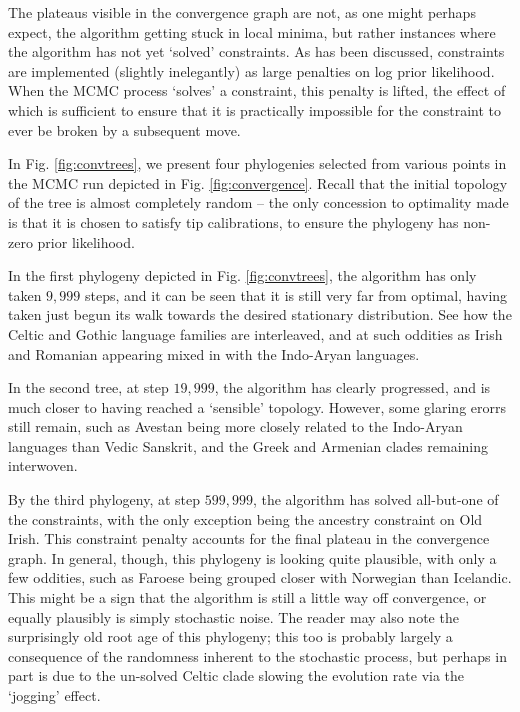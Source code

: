 \documentclass[10pt,journal,compsoc]{IEEEtran}
\begin{document}
The plateaus visible in the convergence graph are not, as one might perhaps expect, the algorithm getting stuck in local minima, but rather instances where the algorithm has not yet `solved' constraints. As has been discussed, constraints are implemented (slightly inelegantly) as large penalties on log prior likelihood. When the MCMC process `solves' a constraint, this penalty is lifted, the effect of which is sufficient to ensure that it is practically impossible for the constraint to ever be broken by a subsequent move.

In Fig. \ref{fig:convtrees}, we present four phylogenies selected from various points in the MCMC run depicted in Fig. \ref{fig:convergence}. Recall that the initial topology of the tree is almost completely random -- the only concession to optimality made is that it is chosen to satisfy tip calibrations, to ensure the phylogeny has non-zero prior likelihood.

In the first phylogeny depicted in Fig. \ref{fig:convtrees}, the algorithm has only taken $9,999$ steps, and it can be seen that it is still very far from optimal, having taken just begun its walk towards the desired stationary distribution. See how the Celtic and Gothic language families are interleaved, and at such oddities as Irish and Romanian appearing mixed in with the Indo-Aryan languages.

In the second tree, at step $19,999$, the algorithm has clearly progressed, and is much closer to having reached a `sensible' topology. However, some glaring erorrs still remain, such as Avestan being more closely related to the Indo-Aryan languages than Vedic Sanskrit, and the Greek and Armenian clades remaining interwoven.

By the third phylogeny, at step $599,999$, the algorithm has solved all-but-one of the constraints, with the only exception being the ancestry constraint on Old Irish. This constraint penalty accounts for the final plateau in the convergence graph. In general, though, this phylogeny is looking quite plausible, with only a few oddities, such as Faroese being grouped closer with Norwegian than Icelandic. This might be a sign that the algorithm is still a little way off convergence, or equally plausibly is simply stochastic noise. The reader may also note the surprisingly old root age of this phylogeny; this too is probably largely a consequence of the randomness inherent to the stochastic process, but perhaps in part is due to the un-solved Celtic clade slowing the evolution rate via the `jogging' effect.
\end{document}
